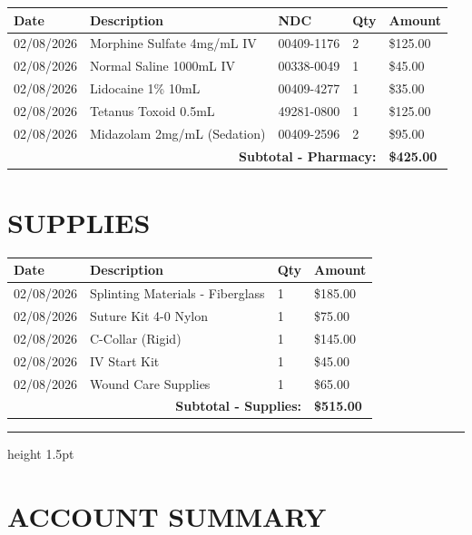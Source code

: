 \documentclass[11pt]{article}
\begin{document}
\begin{longtable}{@{}p{2cm}p{6cm}p{2cm}p{2cm}p{2.5cm}@{}}
\toprule
\textbf{Date} & \textbf{Description} & \textbf{NDC} & \textbf{Qty} & \textbf{Amount} \\
\midrule
\endhead

02/08/2026 & Morphine Sulfate 4mg/mL IV & 00409-1176 & 2 & \$125.00 \\
02/08/2026 & Normal Saline 1000mL IV & 00338-0049 & 1 & \$45.00 \\
02/08/2026 & Lidocaine 1\% 10mL & 00409-4277 & 1 & \$35.00 \\
02/08/2026 & Tetanus Toxoid 0.5mL & 49281-0800 & 1 & \$125.00 \\
02/08/2026 & Midazolam 2mg/mL (Sedation) & 00409-2596 & 2 & \$95.00 \\
\midrule
\multicolumn{4}{r}{\textbf{Subtotal - Pharmacy:}} & \textbf{\$425.00} \\
\bottomrule
\end{longtable}

\section*{SUPPLIES}

\begin{longtable}{@{}p{2cm}p{8cm}p{2.5cm}p{2.5cm}@{}}
\toprule
\textbf{Date} & \textbf{Description} & \textbf{Qty} & \textbf{Amount} \\
\midrule
\endhead

02/08/2026 & Splinting Materials - Fiberglass & 1 & \$185.00 \\
02/08/2026 & Suture Kit 4-0 Nylon & 1 & \$75.00 \\
02/08/2026 & C-Collar (Rigid) & 1 & \$145.00 \\
02/08/2026 & IV Start Kit & 1 & \$45.00 \\
02/08/2026 & Wound Care Supplies & 1 & \$65.00 \\
\midrule
\multicolumn{3}{r}{\textbf{Subtotal - Supplies:}} & \textbf{\$515.00} \\
\bottomrule
\end{longtable}

\vspace{1em}
\hrule height 1.5pt
\vspace{0.5em}

\section*{ACCOUNT SUMMARY}
\end{document}
